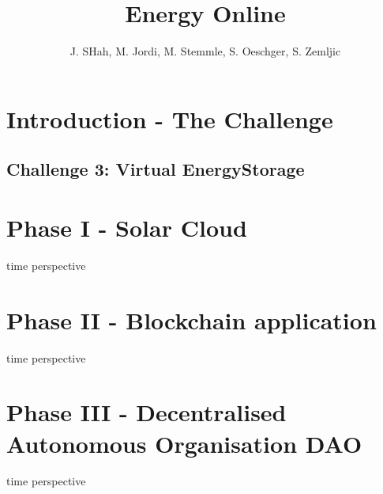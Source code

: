 \documentclass{scrartcl}
\begin{document}
	
	\title{Energy Online}
	\subtitle{}
	\author{J. SHah, M. Jordi, M. Stemmle, S. Oeschger, S. Zemljic}
	
	\maketitle
	
	\section{Introduction - The Challenge}
	
	\subsection{Challenge 3: Virtual EnergyStorage}
	
	
	\section{Phase I - Solar Cloud}
	time perspective
	
	\section{Phase II - Blockchain application}
	time perspective
	
	\section{Phase III - Decentralised Autonomous Organisation DAO}
	time perspective
	
\end{document}
